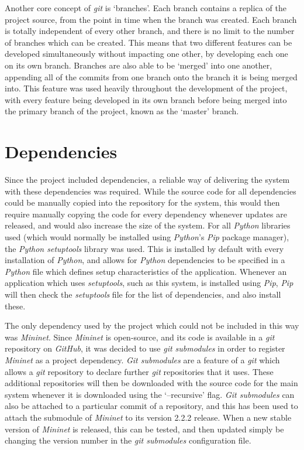 Another core concept of \textit{git} is `branches'.
Each branch contains a replica of the project source, from the point in time when the branch was created.
Each branch is totally independent of every other branch, and there is no limit to the number of branches which can be created.
This means that two different features can be developed simultaneously without impacting one other, by developing each one on its own branch.
Branches are also able to be `merged' into one another, appending all of the commits from one branch onto the branch it is being merged into.
This feature was used heavily throughout the development of the project, with every feature being developed in its own branch before being merged into the primary branch of the project, known as the `master' branch.

\section{Dependencies}
\label{dependencies}

Since the project included dependencies, a reliable way of delivering the system with these dependencies was required.
While the source code for all dependencies could be manually copied into the repository for the system, this would then require manually copying the code for every dependency whenever updates are released, and would also increase the size of the system.
For all \textit{Python} libraries used (which would normally be installed using \textit{Python}'s \textit{Pip} package manager), the \textit{Python setuptools} \cite{python_setuptools} library was used.
This is installed by default with every installation of \textit{Python}, and allows for \textit{Python} dependencies to be specified in a \textit{Python} file which defines setup characteristics of the application.
Whenever an application which uses \textit{setuptools}, such as this system, is installed using \textit{Pip}, \textit{Pip} will then check the \textit{setuptools} file for the list of dependencies, and also install these.

The only dependency used by the project which could not be included in this way was \textit{Mininet}.
Since \textit{Mininet} is open-source, and its code is available in a \textit{git} repository on \textit{GitHub}, it was decided to use \textit{git submodules} in order to register \textit{Mininet} as a project dependency.
\textit{Git submodules} are a feature of a \textit{git} which allows a \textit{git} repository to declare further \textit{git} repositories that it uses.
These additional repositories will then be downloaded with the source code for the main system whenever it is downloaded using the `--recursive' flag.
\textit{Git submodules} can also be attached to a particular commit of a repository, and this has been used to attach the submodule of \textit{Mininet} to its version 2.2.2 release.
When a new stable version of \textit{Mininet} is released, this can be tested, and then updated simply be changing the version number in the \textit{git submodules} configuration file.
